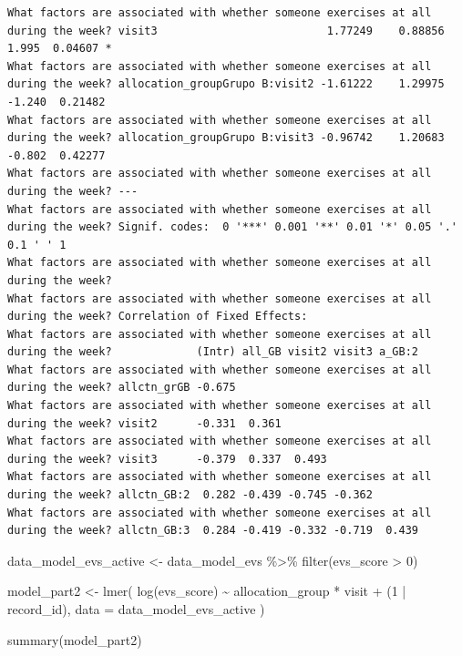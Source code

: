\documentclass[
  12pt,
]{article}
\newenvironment{Shaded}{\begin{snugshade}}{\end{snugshade}}
\newcommand{\AttributeTok}[1]{\textcolor[rgb]{0.40,0.45,0.13}{#1}}
\newcommand{\DecValTok}[1]{\textcolor[rgb]{0.68,0.00,0.00}{#1}}
\newcommand{\FunctionTok}[1]{\textcolor[rgb]{0.28,0.35,0.67}{#1}}
\newcommand{\NormalTok}[1]{\textcolor[rgb]{0.00,0.23,0.31}{#1}}
\newcommand{\OtherTok}[1]{\textcolor[rgb]{0.00,0.23,0.31}{#1}}
\newcommand{\SpecialCharTok}[1]{\textcolor[rgb]{0.37,0.37,0.37}{#1}}
\begin{document}
\begin{verbatim}
What factors are associated with whether someone exercises at all during the week? visit3                          1.77249    0.88856   1.995  0.04607 * 
What factors are associated with whether someone exercises at all during the week? allocation_groupGrupo B:visit2 -1.61222    1.29975  -1.240  0.21482   
What factors are associated with whether someone exercises at all during the week? allocation_groupGrupo B:visit3 -0.96742    1.20683  -0.802  0.42277   
What factors are associated with whether someone exercises at all during the week? ---
What factors are associated with whether someone exercises at all during the week? Signif. codes:  0 '***' 0.001 '**' 0.01 '*' 0.05 '.' 0.1 ' ' 1
What factors are associated with whether someone exercises at all during the week? 
What factors are associated with whether someone exercises at all during the week? Correlation of Fixed Effects:
What factors are associated with whether someone exercises at all during the week?             (Intr) all_GB visit2 visit3 a_GB:2
What factors are associated with whether someone exercises at all during the week? allctn_grGB -0.675                            
What factors are associated with whether someone exercises at all during the week? visit2      -0.331  0.361                     
What factors are associated with whether someone exercises at all during the week? visit3      -0.379  0.337  0.493              
What factors are associated with whether someone exercises at all during the week? allctn_GB:2  0.282 -0.439 -0.745 -0.362       
What factors are associated with whether someone exercises at all during the week? allctn_GB:3  0.284 -0.419 -0.332 -0.719  0.439
\end{verbatim}

\begin{Shaded}
\begin{Highlighting}[]
\NormalTok{data\_model\_evs\_active }\OtherTok{\textless{}{-}}\NormalTok{ data\_model\_evs }\SpecialCharTok{\%\textgreater{}\%}
  \FunctionTok{filter}\NormalTok{(evs\_score }\SpecialCharTok{\textgreater{}} \DecValTok{0}\NormalTok{)}

\NormalTok{model\_part2 }\OtherTok{\textless{}{-}} \FunctionTok{lmer}\NormalTok{(}
  \FunctionTok{log}\NormalTok{(evs\_score) }\SpecialCharTok{\textasciitilde{}}\NormalTok{ allocation\_group }\SpecialCharTok{*}\NormalTok{ visit }\SpecialCharTok{+}\NormalTok{ (}\DecValTok{1} \SpecialCharTok{|}\NormalTok{ record\_id),}
  \AttributeTok{data =}\NormalTok{ data\_model\_evs\_active}
\NormalTok{)}

\FunctionTok{summary}\NormalTok{(model\_part2)}
\end{Highlighting}
\end{Shaded}
\end{document}
